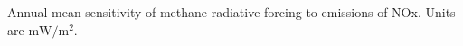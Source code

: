 Annual mean sensitivity of methane radiative forcing to emissions of NOx. Units are $\mathrm{mW/m^2}$.\label{fig:drfdenox}
